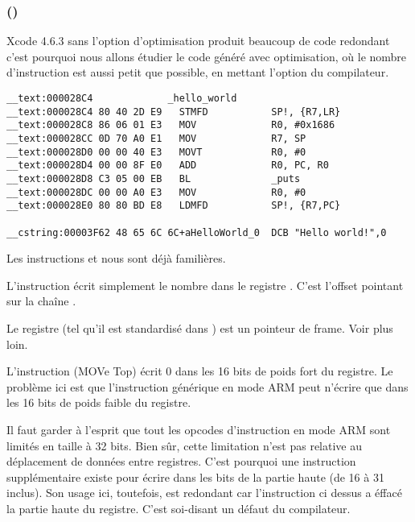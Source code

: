 \subsubsection{\OptimizingXcodeIV (\ARMMode)}

Xcode 4.6.3 sans l'option d'optimisation produit beaucoup de code redondant c'est
pourquoi nous allons étudier le code généré avec optimisation, où le nombre
d'instruction est aussi petit que possible, en mettant l'option \Othree du
compilateur.

\begin{lstlisting}[caption=\OptimizingXcodeIV (\ARMMode),style=customasmARM]
__text:000028C4             _hello_world
__text:000028C4 80 40 2D E9   STMFD           SP!, {R7,LR}
__text:000028C8 86 06 01 E3   MOV             R0, #0x1686
__text:000028CC 0D 70 A0 E1   MOV             R7, SP
__text:000028D0 00 00 40 E3   MOVT            R0, #0
__text:000028D4 00 00 8F E0   ADD             R0, PC, R0
__text:000028D8 C3 05 00 EB   BL              _puts
__text:000028DC 00 00 A0 E3   MOV             R0, #0
__text:000028E0 80 80 BD E8   LDMFD           SP!, {R7,PC}

__cstring:00003F62 48 65 6C 6C+aHelloWorld_0  DCB "Hello world!",0
\end{lstlisting}

Les instructions  et  nous sont déjà familières.


L'instruction \MOV écrit simplement le nombre  dans le registre .
C'est l'offset pointant sur la chaîne .

Le registre  (tel qu'il est standardisé dans \IOSABI) est un pointeur de frame. Voir plus loin.

L'instruction  (MOVe Top) écrit 0 dans les 16 bits de poids
fort du registre.
Le problème ici est que l'instruction générique \MOV en mode ARM peut n'écrire
que dans les 16 bits de poids faible du registre.

Il faut garder à l'esprit que tout les opcodes d'instruction en mode ARM sont
limités en taille à 32 bits. Bien sûr, cette limitation n'est pas relative
au déplacement de données entre registres.
C'est pourquoi une instruction supplémentaire existe  pour écrire dans
les bits de la partie haute (de 16 à 31 inclus).
Son usage ici, toutefois, est redondant car l'instruction 
ci dessus a éffacé la partie haute du registre.
C'est soi-disant un défaut du compilateur.

